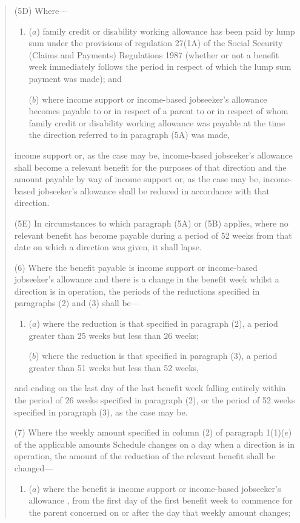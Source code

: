 \documentclass[a4paper]{article}
\begin{document}
{\begin{quotation}
(5D) Where—
\begin{enumerate}\item[]
($a$) family credit or disability working allowance has been paid by lump sum under the provisions of regulation 27(1A) of the Social Security (Claims and Payments) Regulations 1987 (whether or not a benefit week immediately follows the period in respect of which the lump sum payment was made); and

($b$) where income support 
or income-based jobseeker’s allowance  %
becomes payable to or in respect of a parent to or in respect of whom family credit or disability working allowance was payable at the time the direction referred to in paragraph (5A) was made, 
\end{enumerate}
income support 
or, as the case may be, income-based jobseeker’s allowance  %
shall become a relevant benefit for the purposes of that direction and the amount payable by way of income support 
or, as the case may be, income-based jobseeker’s allowance  %
shall be reduced in accordance with that direction.

(5E) In circumstances to which paragraph (5A) or (5B) applies, where no relevant benefit has become payable during a period of 52 weeks from that date on which a direction was given, it shall lapse.

(6) Where the benefit payable is income support 
or income-based jobseeker’s allowance  %
and there is a change in the benefit week whilst a direction is in operation, the periods of the reductions specified in paragraphs (2) and (3) shall be—
\begin{enumerate}\item[]
($a$) where the reduction is that specified in paragraph (2), a period greater than 25 weeks but less than 26 weeks;

($b$) where the reduction is that specified in paragraph (3), a period greater than 51 weeks but less than 52 weeks,
\end{enumerate}
and ending on the last day of the last benefit week falling entirely within the period of 26 weeks specified in paragraph (2), or the period of 52 weeks specified in paragraph (3), as the case may be.

(7) Where the weekly amount specified in column (2) of paragraph 1(1)($e$) of the applicable amounts Schedule changes on a day when a direction is in operation, the amount of the reduction of the relevant benefit shall be changed—
\begin{enumerate}\item[]
($a$) where the benefit is income support
or income-based jobseeker’s allowance%
, from the first day of the first benefit week to commence for the parent concerned on or after the day that weekly amount changes;


\end{enumerate}
\end{quotation}}
\end{document}
